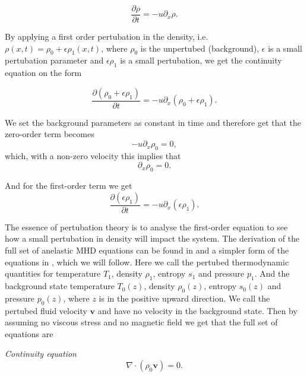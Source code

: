 \documentclass{article}
\begin{document}
\begin{equation*}
    \frac{\partial\rho}{\partial t} = -u\partial_x\rho.
\end{equation*}

By applying a first order pertubation in the density, i.e. $\rho(x,t)=\rho_0 + \epsilon\rho_1(x,t)$, where $\rho_0$ is the unpertubed (background), $\epsilon$ is a small pertubation parameter and $\epsilon\rho_1$ is a small pertubation, we get the continuity equation on the form

\begin{equation*}
    \frac{\partial(\rho_0+\epsilon\rho_1)}{\partial t} = -u\partial_x(\rho_0+\epsilon\rho_1).
\end{equation*}

We set the background parameters as constant in time and therefore get that the zero-order term becomes
\begin{equation*}
    -u\partial_x\rho_0 = 0,
\end{equation*}
which, with a non-zero velocity this implies that
\begin{equation*}
    \partial_x\rho_0 = 0.
\end{equation*}

And for the first-order term we get
\begin{equation*}
    \frac{\partial(\epsilon\rho_1)}{\partial t} = -u\partial_x(\epsilon\rho_1).
\end{equation*}

The essence of pertubation theory is to analyse the first-order equation to see how a small pertubation in density will impact the system. The derivation of the full set of anelastic MHD equations can be found in \citep{1999ApJS..121..247L} and a simpler form of the equations in \citep{2021LRSP...18....5F}, which we will follow. Here we call the pertubed thermodynamic quantities for temperature $T_1$, density $\rho_1$, entropy $s_1$ and pressure $p_1$. And the background state temperature $T_0(z)$, density $\rho_0(z)$, entropy $s_0(z)$ and pressure $p_0(z)$, where $z$ is in the positive upward direction. We call the pertubed fluid velocity $\mathbf{v}$ and have no velocity in the background state. Then by assuming no viscous stress and no magnetic field we get that the full set of equations are

\textit{Continuity equation}
\begin{equation}\label{eq:continuity_full}
    \nabla\cdot(\rho_0\mathbf{v})=0.
\end{equation}
\end{document}
